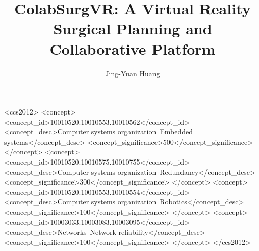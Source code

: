 \documentclass[manuscript]{acmart} %
\begin{document}
\title{ColabSurgVR: A Virtual Reality Surgical Planning and Collaborative Platform}


\author{Jing-Yuan Huang}

\renewcommand{\shortauthors}{Jing-Yuan Huang, et al.}

\begin{abstract}

\vspace{-0.45em}
\end{abstract}



\begin{CCSXML}
<ccs2012>
 <concept>
  <concept_id>10010520.10010553.10010562</concept_id>
  <concept_desc>Computer systems organization~Embedded systems</concept_desc>
  <concept_significance>500</concept_significance>
 </concept>
 <concept>
  <concept_id>10010520.10010575.10010755</concept_id>
  <concept_desc>Computer systems organization~Redundancy</concept_desc>
  <concept_significance>300</concept_significance>
 </concept>
 <concept>
  <concept_id>10010520.10010553.10010554</concept_id>
  <concept_desc>Computer systems organization~Robotics</concept_desc>
  <concept_significance>100</concept_significance>
 </concept>
 <concept>
  <concept_id>10003033.10003083.10003095</concept_id>
  <concept_desc>Networks~Network reliability</concept_desc>
  <concept_significance>100</concept_significance>
 </concept>
</ccs2012>
\end{CCSXML}
\end{document}
